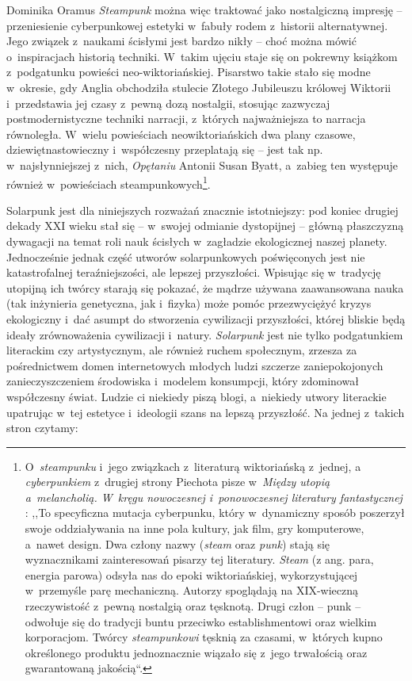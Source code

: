 \begin{artplenv}{Dominika Oramus}
\textit{Steampunk} można więc traktować jako nostalgiczną impresję -- przeniesienie cyberpunkowej estetyki w~fabuły rodem z~historii alternatywnej. Jego związek z~naukami ścisłymi jest bardzo nikły -- choć można mówić o~inspiracjach historią techniki. W~takim ujęciu staje się on pokrewny książkom z~podgatunku powieści neo-wiktoriańskiej. Pisarstwo takie stało się modne w~okresie, gdy Anglia obchodziła stulecie Złotego Jubileuszu królowej Wiktorii i~przedstawia jej czasy z~pewną dozą nostalgii, stosując zazwyczaj postmodernistyczne techniki narracji, z~których najważniejsza to narracja równoległa. W~wielu powieściach neowiktoriańskich dwa plany czasowe, dziewiętnastowieczny i~współczesny przeplatają się -- jest tak np. w~najsłynniejszej z~nich, \textit{Opętaniu} Antonii Susan Byatt, a~zabieg ten występuje również w~powieściach steampunkowych\footnote{O~\textit{steampunku} i~jego związkach z~literaturą wiktoriańską z~jednej, a \textit{cyberpunkiem} z~drugiej strony Piechota pisze w~\textit{Między utopią a~melancholią. W~kręgu nowoczesnej i~ponowoczesnej literatury fantastycznej}
\parencite*[][s.~87–90]{piechota_miedzy_2015}: %
 ,,To specyficzna mutacja cyberpunku, który w~dynamiczny sposób poszerzył swoje oddziaływania na inne pola kultury, jak film, gry komputerowe, a~nawet design. Dwa człony nazwy (\textit{steam} oraz \textit{punk}) stają się wyznacznikami zainteresowań pisarzy tej literatury. \textit{Steam} (z ang. para, energia parowa) odsyła nas do epoki wiktoriańskiej, wykorzystującej w~przemyśle parę mechaniczną. Autorzy spoglądają na XIX-wieczną rzeczywistość z~pewną nostalgią oraz tęsknotą. Drugi człon -- punk -- odwołuje się do tradycji buntu przeciwko establishmentowi oraz wielkim korporacjom. Twórcy \textit{steampunkowi} tęsknią za czasami, w~których kupno określonego produktu jednoznacznie wiązało się z~jego trwałością oraz gwarantowaną jakością``.}.

Solarpunk jest dla niniejszych rozważań znacznie istotniejszy: pod koniec drugiej dekady XXI wieku stał się -- w~swojej odmianie dystopijnej -- główną płaszczyzną dywagacji na temat roli nauk ścisłych w~zagładzie ekologicznej naszej planety. Jednocześnie jednak część utworów solarpunkowych poświęconych jest nie katastrofalnej teraźniejszości, ale lepszej przyszłości. Wpisując się w~tradycję utopijną ich twórcy starają się pokazać, że mądrze używana zaawansowana nauka (tak inżynieria genetyczna, jak i~fizyka) może pomóc przezwyciężyć kryzys ekologiczny i~dać asumpt do stworzenia cywilizacji przyszłości, której bliskie będą ideały zrównoważenia cywilizacji i~natury. \textit{Solarpunk} jest nie tylko podgatunkiem literackim czy artystycznym, ale również ruchem społecznym, zrzesza za pośrednictwem domen internetowych młodych ludzi szczerze zaniepokojonych zanieczyszczeniem środowiska i~modelem konsumpcji, który zdominował współczesny świat. Ludzie ci niekiedy piszą blogi, a~niekiedy utwory literackie upatrując w~tej estetyce i~ideologii szans na lepszą przyszłość. Na jednej z~takich stron czytamy:


\end{artplenv}
